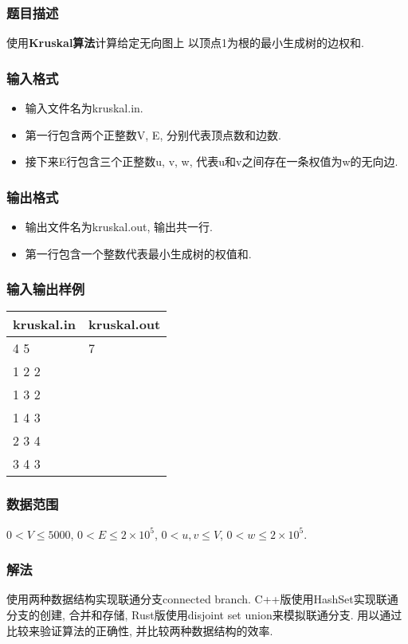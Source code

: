 \subsubsection{题目描述}
使用\textbf{Kruskal算法}计算给定无向图上  以顶点1为根的最小生成树的边权和.
\subsubsection{输入格式}
\begin{itemize}
	\item 输入文件名为kruskal.in.
	\item 第一行包含两个正整数V, E, 分别代表顶点数和边数.
	\item 接下来E行包含三个正整数u, v, w, 代表u和v之间存在一条权值为w的无向边.
\end{itemize}

\subsubsection{输出格式}
\begin{itemize}
	\item 输出文件名为kruskal.out, 输出共一行.
	\item 第一行包含一个整数代表最小生成树的权值和.
\end{itemize}

\subsubsection{输入输出样例}
\begin{table}[h!]
	\centering
	\begin{tabular}{|l|l|}
		\hline
		kruskal.in & kruskal.out \\
		\hline
		4 5        & 7           \\
		1 2 2      & ~           \\
		1 3 2      & ~           \\
		1 4 3      & ~           \\
		2 3 4      & ~           \\
		3 4 3      & ~           \\
		\hline
	\end{tabular}
\end{table}

\subsubsection{数据范围}
$0 < V \leq 5000$,
$0 < E \leq 2\times 10^5$,
$0 < u,v \leq V$,
$0 < w \leq 2\times 10^5$.

\subsubsection{解法}
使用两种数据结构实现联通分支connected branch.
C++版使用HashSet实现联通分支的创建, 合并和存储,
Rust版使用disjoint set union来模拟联通分支. 用以通过比较来验证算法的正确性,
并比较两种数据结构的效率.

